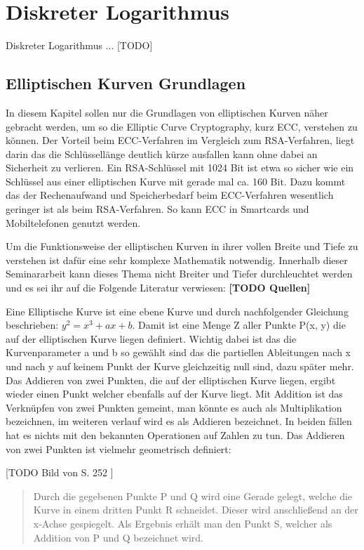 \section{Diskreter Logarithmus}
	Diskreter Logarithmus ... [TODO]
	
	\subsection{Elliptischen Kurven Grundlagen}
		In diesem Kapitel sollen nur die Grundlagen von elliptischen Kurven näher gebracht werden, um so die Elliptic Curve Cryptography, kurz ECC, verstehen zu können. Der Vorteil beim ECC-Verfahren im Vergleich zum RSA-Verfahren, liegt darin das die Schlüssellänge deutlich kürze ausfallen kann ohne dabei an Sicherheit zu verlieren. Ein RSA-Schlüssel mit 1024 Bit ist etwa so sicher wie ein Schlüssel aus einer elliptischen Kurve mit gerade mal ca. 160 Bit. Dazu kommt das der Rechenaufwand und Speicherbedarf beim ECC-Verfahren wesentlich geringer ist als beim RSA-Verfahren. So kann ECC in Smartcards und Mobiltelefonen genutzt werden.\cite{Information:und:Kommunikation}
				
		Um die Funktionsweise der elliptischen Kurven in ihrer vollen Breite und Tiefe zu verstehen ist dafür eine sehr komplexe Mathematik notwendig. Innerhalb dieser Seminararbeit kann dieses Thema nicht Breiter und Tiefer durchleuchtet werden und es sei ihr auf die Folgende Literatur verwiesen: \textbf{[TODO Quellen]}
		
		Eine Elliptische Kurve ist eine ebene Kurve und durch nachfolgender Gleichung beschrieben: $y^2 = x^3 + ax +b$. Damit ist eine Menge Z aller Punkte P(x, y) die auf der elliptischen Kurve liegen definiert. Wichtig dabei ist das die Kurvenparameter a und b so gewählt sind das die partiellen Ableitungen nach x und nach y auf keinem Punkt der Kurve gleichzeitig null sind, dazu später mehr.
		Das Addieren von zwei Punkten, die auf der elliptischen Kurve liegen, ergibt wieder einen Punkt welcher ebenfalls auf der Kurve liegt.\cite{Information:und:Kommunikation} Mit Addition ist das Verknüpfen von zwei Punkten gemeint, man könnte es auch als Multiplikation bezeichnen, im weiteren verlauf wird es als Addieren bezeichnet. In beiden fällen hat es nichts mit den bekannten Operationen auf Zahlen zu tun. Das Addieren von zwei Punkten ist vielmehr geometrisch definiert:
		
		[TODO Bild von S. 252 \cite{Information:und:Kommunikation}]
		
		\begin{quote}
			\begin{defi}
				Durch die gegebenen Punkte P und Q wird eine Gerade gelegt, welche die Kurve in einem dritten Punkt R schneidet. Dieser wird anschließend an der x-Achse 
				gespiegelt. Als Ergebnis erhält man den Punkt S, welcher als Addition von P und Q bezeichnet wird.\cite{Information:und:Kommunikation}
			\end{defi}
		\end{quote}
		
